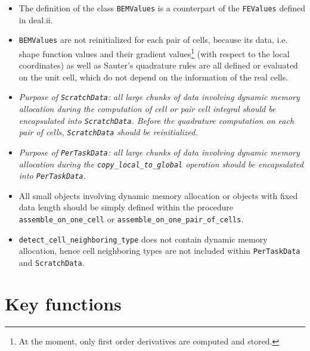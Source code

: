 \documentclass[11pt, a4paper]{book}
\begin{document}
\begin{itemize}
\item The definition of the class \texttt{BEMValues} is a counterpart of the \texttt{FEValues}
  defined in deal.ii.
\item \texttt{BEMValues} are not reinitialized for each pair of cells, because its data,
  i.e. shape function values and their gradient values\footnote{At the moment, only first
    order derivatives are computed and stored.} (with respect to the local
  coordinates) as well as Sauter's quadrature rules are all defined or evaluated on the
  unit cell, which do not depend on the information of the real cells.
\item \emph{Purpose of \texttt{ScratchData}: all large chunks of data involving dynamic memory
    allocation during the computation of cell or pair cell integral should be encapsulated into
    \texttt{ScratchData}. Before the quadrature computation on each pair of cells,
    \texttt{ScratchData} should be reinitialized.}
\item \emph{Purpose of \texttt{PerTaskData}: all large chunks of data involving dynamic memory
    allocation during the \texttt{copy\_local\_to\_global} operation should be encapsulated into
    \texttt{PerTaskData}.}
\item All small objects involving dynamic memory allocation or objects with fixed data
  length should be simply defined within the procedure \texttt{assemble\_on\_one\_cell} or
  \texttt{assemble\_on\_one\_pair\_of\_cells}.
\item \texttt{detect\_cell\_neighboring\_type} does not contain dynamic memory allocation, hence
  cell neighboring types are not included within \texttt{PerTaskData} and \texttt{ScratchData}.
\end{itemize}

\section{Key functions}
\end{document}

